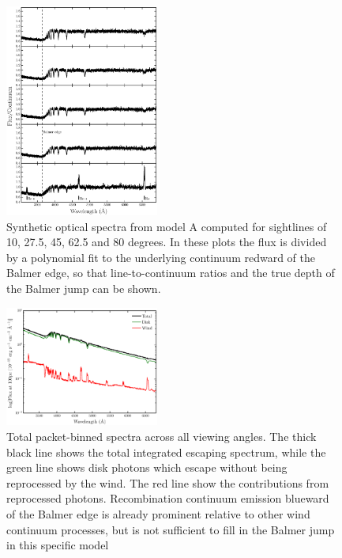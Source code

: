 \documentclass[preprint, a4paper, 11pt]{aastex}
\begin{document}
\begin{figure} 
\includegraphics[width=0.45\textwidth]{figures/modela_opt_cont.eps}
\caption{Synthetic optical spectra from model A computed for 
sightlines of 10, 27.5, 45, 62.5 and 80 degrees. In these plots
the flux is divided by a polynomial fit to the 
underlying continuum redward of the Balmer edge, so that 
line-to-continuum ratios and the true depth of the
Balmer jump can be shown.}
\label{spec_continuum}
\end{figure} 

\begin{figure} 
\includegraphics[width=0.45\textwidth]{figures/modela_escaping.eps}
\caption{Total packet-binned spectra across all viewing angles. 
The thick black line shows the total 
integrated escaping spectrum, 
while the green line shows disk photons which escape without being reprocessed by
the wind. The red line show the contributions from reprocessed photons. 
Recombination continuum emission blueward of the Balmer 
edge is already prominent relative to other wind continuum processes, but is not sufficient
to fill in the Balmer jump in this specific model}
\label{cont}
\end{figure} 


\newpage
\end{document}
